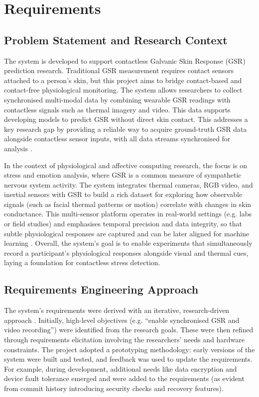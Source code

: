 \chapter{Requirements}


\section{Problem Statement and Research Context}
The system is developed to support contactless Galvanic Skin Response (GSR) prediction research. Traditional GSR measurement requires contact sensors attached to a person's skin, but this project aims to bridge contact-based and contact-free physiological monitoring. The system allows researchers to collect synchronised multi-modal data by combining wearable GSR readings with contactless signals such as thermal imagery and video. This data supports developing models to predict GSR without direct skin contact. This addresses a key research gap by providing a reliable way to acquire ground-truth GSR data alongside contactless sensor inputs, with all data streams synchronised for analysis \citep{ref1}.

In the context of physiological and affective computing research, the focus is on stress and emotion analysis, where GSR is a common measure of sympathetic nervous system activity. The system integrates thermal cameras, RGB video, and inertial sensors with GSR to build a rich dataset for exploring how observable signals (such as facial thermal patterns or motion) correlate with changes in skin conductance. This multi-sensor platform operates in real-world settings (e.g. labs or field studies) and emphasises temporal precision and data integrity, so that subtle physiological responses are captured and can be later aligned for machine learning \citep{ref1}. Overall, the system's goal is to enable experiments that simultaneously record a participant's physiological responses alongside visual and thermal cues, laying a foundation for contactless stress detection.


\section{Requirements Engineering Approach}
The system's requirements were derived with an iterative, research-driven approach \citep{ref12}. Initially, high-level objectives (e.g. ``enable synchronised GSR and video recording'') were identified from the research goals. These were then refined through requirements elicitation involving the researchers' needs and hardware constraints. The project adopted a prototyping methodology: early versions of the system were built and tested, and feedback was used to update the requirements. For example, during development, additional needs like data encryption and device fault tolerance emerged and were added to the requirements (as evident from commit history introducing security checks and recovery features).

